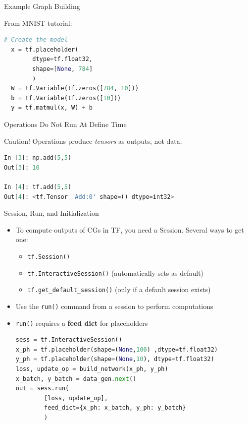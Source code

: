 \documentclass[]{beamer}
\begin{document}
\begin{frame}[fragile]{Example Graph Building}

From MNIST tutorial:

\begin{lstlisting}[language=python]
  # Create the model
  x = tf.placeholder(
        dtype=tf.float32, 
        shape=[None, 784]
        )
  W = tf.Variable(tf.zeros([784, 10]))
  b = tf.Variable(tf.zeros([10]))
  y = tf.matmul(x, W) + b
\end{lstlisting}

\end{frame}

\begin{frame}[fragile]{Operations Do Not Run At Define Time}

Caution!  Operations produce \textit{tensors} as outputs, not data.

\begin{lstlisting}[language=python]
In [3]: np.add(5,5)
Out[3]: 10

In [4]: tf.add(5,5)
Out[4]: <tf.Tensor 'Add:0' shape=() dtype=int32>
\end{lstlisting}

\end{frame}

\begin{frame}[fragile]{Session, Run, and Initialization}

\begin{itemize}
\item To compute outputs of CGs in TF, you need a Session. Several ways to get one:
\begin{itemize}
\item \verb|tf.Session()| 
\item \verb|tf.InteractiveSession()| (automatically sets as default)
\item \verb|tf.get_default_session()| (only if a default session exists)
\end{itemize}
\item Use the \verb|run()| command from a session to perform computations
\item \verb|run()| requires a \textbf{feed dict} for placeholders

\begin{lstlisting}[language=python]
sess = tf.InteractiveSession()
x_ph = tf.placeholder(shape=(None,100) ,dtype=tf.float32)
y_ph = tf.placeholder(shape=(None,10), dtype=tf.float32)
loss, update_op = build_network(x_ph, y_ph)
x_batch, y_batch = data_gen.next()
out = sess.run(
        [loss, update_op], 
        feed_dict={x_ph: x_batch, y_ph: y_batch}
        )
\end{lstlisting}
\end{itemize}

\end{frame}
\end{document}
